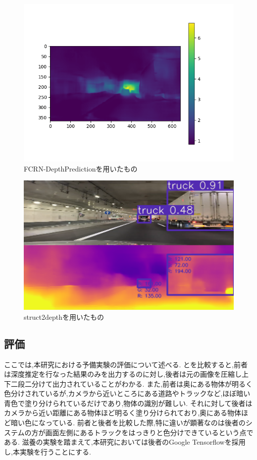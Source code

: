   \begin{figure}[htbp]
  \begin{center}
   \includegraphics[width=12cm]{figs/preex1.png}
  \end{center}
  \caption{FCRN-DepthPredictionを用いたもの}
  \label{fig:preex1}
\end{figure}

\begin{figure}[htbp]
 \begin{center}
  \includegraphics[width=12cm]{figs/preex2.png}
\end{center}
  \caption{struct2depthを用いたもの}
  \label{fig:preex2}
\end{figure}
\newpage
\subsection{評価}
ここでは,本研究における予備実験の評価について述べる.
とを比較すると,前者は深度推定を行なった結果のみを出力するのに対し,後者は元の画像を圧縮し上下二段二分けて出力されていることがわかる.
また,前者は奥にある物体が明るく色分けされているが,カメラから近いところにある道路やトラックなど,ほぼ暗い青色で塗り分けられているだけであり,物体の識別が難しい.
それに対して後者はカメラから近い距離にある物体ほど明るく塗り分けられており,奥にある物体ほど暗い色になっている.
前者と後者を比較した際,特に違いが顕著なのは後者のシステムの方が画面左側にあるトラックをはっきりと色分けできているという点である.
滋養の実験を踏まえて,本研究においては後者のGoogle Tensorflowを採用し,本実験を行うことにする.

